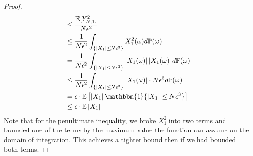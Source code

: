 \documentclass[12pt]{article}
\newcommand*{\abs}[1]{\left\lvert#1\right\rvert}
\newcommand{\E}{\mathbb{E}}
\newcommand{\Prob}{\mathbb{P}}
\begin{document}
\begin{proof}
\begin{align*}
							      &\leq  \frac{\E[Y_{N,1}^2]}{N\epsilon^2} \\
							      &\leq \frac{1}{N\epsilon^2} \int_{\{\abs{X_1} \leq N\epsilon^3\}} X_1^2(\omega) d\Prob(\omega) \\
							      &= \frac{1}{N\epsilon^2} \int_{\{\abs{X_1} \leq N\epsilon^3\}} \abs{X_1(\omega)}\abs{X_1(\omega)} d\Prob(\omega) \\
							      &\leq \frac{1}{N\epsilon^2} \int_{\{\abs{X_1} \leq N\epsilon^3\}} \abs{X_1(\omega)} \cdot N\epsilon^3 d\Prob(\omega) \\
							      &= \epsilon \cdot \E\left[\abs{X_1}\mathbbm{1}\{\abs{X_1} \leq N\epsilon^3\} \right] \\ 
							      &\leq \epsilon \cdot \E\abs{X_1}
 \end{align*}
 Note that for the penultimate inequality, we broke $X_1^2$ into two terms and bounded one of the terms by the maximum value the function can assume on the domain of integration. This achieves a tighter bound 
 then if we had bounded both terms. 
 

\end{proof}
\end{document}
